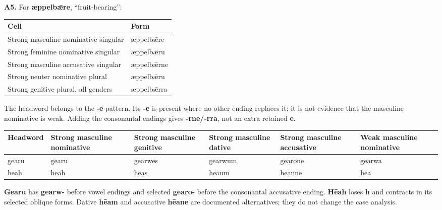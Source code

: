 \par\begin{minipage}{\linewidth}\raggedright
\textbf{A5.} For \textbf{æppelbǣre}, “fruit-bearing”:

\par\begingroup
\fontsize{10.5}{13.2}\selectfont
\setlength{\LTleft}{0pt}\setlength{\LTright}{\fill}
\noindent
\begin{tabular}{@{}>{\raggedright\arraybackslash}p{82.96mm}>{\raggedright\arraybackslash}p{38.23mm}@{}}
\toprule
\textbf{Cell} & \textbf{Form} \\
\midrule
Strong masculine nominative singular & æppelbǣre \\
Strong feminine nominative singular & æppelbǣru \\
Strong masculine accusative singular & æppelbǣrne \\
Strong neuter nominative plural & æppelbǣru \\
Strong genitive plural, all genders & æppelbǣrra \\
\bottomrule
\end{tabular}
\par\endgroup

The headword belongs to the \textbf{-e} pattern. Its \textbf{-e} is present where no other ending replaces it; it is not evidence that the masculine nominative is weak. Adding the consonantal endings gives \textbf{-rne/\allowbreak{}-rra}, not an extra retained \textbf{e}.

\par\begingroup
\fontsize{10}{12.8}\selectfont
\setlength{\LTleft}{0pt}\setlength{\LTright}{\fill}
\noindent
\begin{tabular}{@{}>{\raggedright\arraybackslash}p{18.5mm}>{\raggedright\arraybackslash}p{19.39mm}>{\raggedright\arraybackslash}p{17.69mm}>{\raggedright\arraybackslash}p{16.63mm}>{\raggedright\arraybackslash}p{19.39mm}>{\raggedright\arraybackslash}p{18.33mm}@{}}
\toprule
\textbf{Headword} & \textbf{Strong masculine nominative} & \textbf{Strong masculine genitive} & \textbf{Strong masculine dative} & \textbf{Strong masculine accusative} & \textbf{Weak masculine nominative} \\
\midrule
gearu & gearu & gearwes & gearwum & gearone & gearwa \\
hēah & hēah & hēas & hēaum & hēanne & hēa \\
\bottomrule
\end{tabular}
\par\endgroup

\textbf{Gearu} has \textbf{gearw-} before vowel endings and selected \textbf{gearo-} before the consonantal accusative ending. \textbf{Hēah} loses \textbf{h} and contracts in its selected oblique forms. Dative \textbf{hēam} and accusative \textbf{hēane} are documented alternatives; they do not change the case analysis.

\end{minipage}\par\addvspace{4pt}

